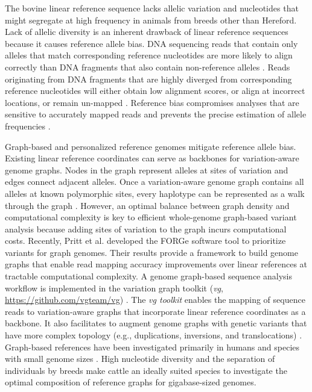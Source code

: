 \documentclass[../main.tex]{subfiles}
\begin{document}
The bovine linear reference sequence lacks allelic variation and nucleotides that might segregate at high frequency in animals from breeds other than Hereford. Lack of allelic diversity is an inherent drawback of linear reference sequences because it causes reference allele bias. DNA sequencing reads that contain only alleles that match corresponding reference nucleotides are more likely to align correctly than DNA fragments that also contain non-reference alleles \citep{van2015wasp,paten2017genome}. Reads originating from DNA fragments that are highly diverged from corresponding reference nucleotides will either obtain low alignment scores, or align at incorrect locations, or remain un-mapped \citep{pritt2018forge}. Reference bias compromises analyses that are sensitive to accurately mapped reads and prevents the precise estimation of allele frequencies \citep{van2015wasp,gunther2019presence,salavati2019elimination,degner2009effect}.

Graph-based \citep{garrison2018variation,paten2017genome} and personalized reference genomes \citep{ballouz2019time,groza2020personalized} mitigate reference allele bias. Existing linear reference coordinates can serve as backbones for variation-aware genome graphs. Nodes in the graph represent alleles at sites of variation and edges connect adjacent alleles. Once a variation-aware genome graph contains all alleles at known polymorphic sites, every haplotype can be represented as a walk through the graph \citep{siren2020haplotype}. However, an optimal balance between graph density and computational complexity is key to efficient whole-genome graph-based variant analysis because adding sites of variation to the graph incurs computational costs. Recently, Pritt et al. \citet{pritt2018forge} developed the FORGe software tool to prioritize variants for graph genomes. Their results provide a framework to build genome graphs that enable read mapping accuracy improvements over linear references at tractable computational complexity. A genome graph-based sequence analysis workflow is implemented in the variation graph toolkit (\emph{vg}, \url{https://github.com/vgteam/vg}) \citep{garrison2018variation}. The \emph{vg toolkit} enables the mapping of sequence reads to variation-aware graphs that incorporate linear reference coordinates as a backbone. It also facilitates to augment genome graphs with genetic variants that have more complex topology (e.g., duplications, inversions, and translocations) \citep{hickey2020genotyping}. Graph-based references have been investigated primarily in humans and species with small genome sizes \citep{paten2017genome}. High nucleotide diversity and the separation of individuals by breeds make cattle an ideally suited species to investigate the optimal composition of reference graphs for gigabase-sized genomes.
\end{document}
